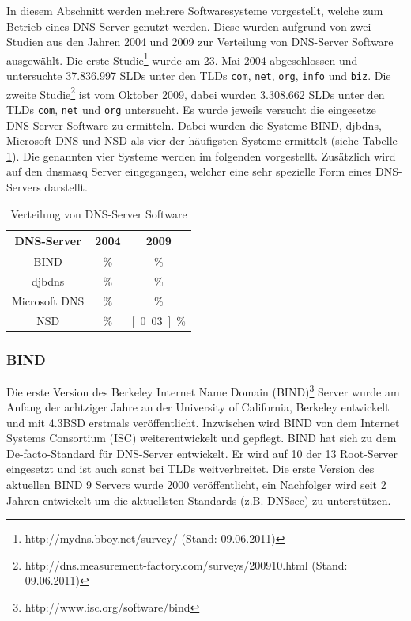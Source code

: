 \documentclass[a4paper, 12pt, BCOR10mm, DIV12, toc=bibliography, toc=listof, german]{scrbook}
\begin{document}
				In diesem Abschnitt werden mehrere Softwaresysteme vorgestellt, welche zum Betrieb eines
				DNS-Server genutzt werden. Diese wurden aufgrund von zwei Studien aus den Jahren 2004 und
				2009 zur Verteilung von DNS-Server Software ausgewählt. Die erste
				Studie\footnote{http://mydns.bboy.net/survey/ (Stand: 09.06.2011)} wurde am 23. Mai 2004
				abgeschlossen und untersuchte 37.836.997 SLDs unter den TLDs \texttt{com}, \texttt{net},
				\texttt{org},	\texttt{info} und \texttt{biz}. Die zweite
				Studie\footnote{http://dns.measurement-factory.com/surveys/200910.html (Stand: 09.06.2011)}
				ist vom Oktober 2009, dabei wurden 3.308.662 SLDs unter den TLDs \texttt{com}, \texttt{net}
				und \texttt{org} untersucht. Es wurde jeweils versucht die eingesetze DNS-Server Software zu
				ermitteln. Dabei wurden die Systeme BIND, djbdns, Microsoft DNS und NSD als vier der
				häufigsten Systeme ermittelt (siehe Tabelle \ref{tab:verteilung}). Die genannten vier
				Systeme werden im folgenden vorgestellt. Zusätzlich wird auf den dnsmasq Server eingegangen,
			welcher eine sehr spezielle Form eines DNS-Servers darstellt.
				
				\begin{table}
					\centering
					\begin{tabular}{|c|c|c|}\hline
						DNS-Server & 2004 & 2009 \\\hline
						BIND & \unit[70,11]{\%} & \unit[73,85]{\%} \\
						djbdns & \unit[15,57]{\%} & \unit[2,56]{\%} \\
						Microsoft DNS & \unit[6,24]{\%} & \unit[0,26]{\%}\\
						NSD & \unit[0,20]{\%} & \unit[0.03]{\%} \\\hline
					\end{tabular}
					\caption{Verteilung von DNS-Server Software}
					\label{tab:verteilung}
				\end{table}

				\subsubsection*{BIND} %

				Die erste Version des Berkeley Internet Name Domain
				(BIND)\footnote{http://www.isc.org/software/bind} Server wurde am Anfang der achtziger Jahre
				an der University of California, Berkeley entwickelt und mit 4.3BSD erstmals
				veröffentlicht. Inzwischen wird BIND von dem Internet Systems Consortium (ISC)
				weiterentwickelt und gepflegt. BIND hat sich zu dem De-facto-Standard für DNS-Server
				entwickelt. Er wird auf 10 der 13 Root-Server eingesetzt und ist auch sonst bei TLDs
				weitverbreitet. Die erste Version des aktuellen BIND 9 Servers wurde 2000 veröffentlicht,
				ein Nachfolger wird seit 2 Jahren entwickelt um die aktuellsten Standards (z.B.  DNSsec) zu
				unterstützen.
\end{document}
